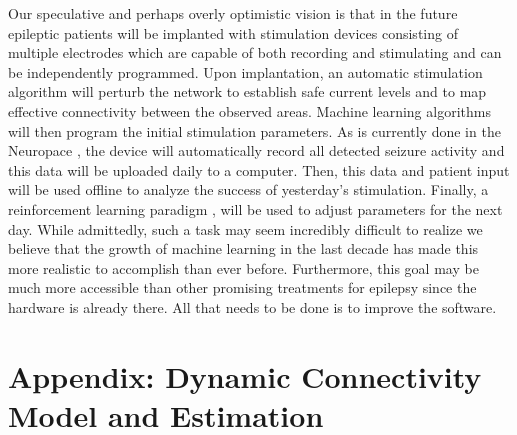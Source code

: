 \documentclass[11pt,a4paper,final]{article}
\begin{document}
Our speculative and perhaps overly optimistic vision is that in the future epileptic patients will be implanted with stimulation devices consisting of multiple electrodes which are capable of both recording and stimulating \citep{ryapolova14} and can be independently programmed.
Upon implantation, an automatic stimulation algorithm will perturb the network to establish safe current levels and to map effective connectivity between the observed areas.
Machine learning algorithms will then program the initial stimulation parameters.
As is currently done in the Neuropace \citep{NP}, the device will automatically record all detected seizure activity and this data will be uploaded daily to a computer.
Then, this data and patient input will be used offline to analyze the success of yesterday's stimulation.
Finally, a reinforcement learning paradigm \citep{gosavi14}, will be used to adjust parameters for the next day.
While admittedly, such a task may seem incredibly difficult to realize we believe that the growth of machine learning in the last decade has made this more realistic to accomplish than ever before.
Furthermore, this goal may be much more accessible than other promising treatments for epilepsy since the hardware is already there.
All that needs to be done is to improve the software.

\section*{Appendix: Dynamic Connectivity Model and Estimation}
\end{document}
